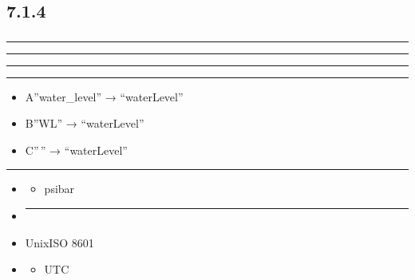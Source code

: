 \subsection{7.1.4}\label{section-24}

\subsubsection{}\label{section-25}

\begin{center}\rule{0.5\linewidth}{0.5pt}\end{center}

\begin{center}\rule{0.5\linewidth}{0.5pt}\end{center}

\begin{center}\rule{0.5\linewidth}{0.5pt}\end{center}

\begin{center}\rule{0.5\linewidth}{0.5pt}\end{center}

\begin{itemize}
\tightlist
\item
  A''water\_level'' → ``waterLevel''
\item
  B''WL'' → ``waterLevel''
\item
  C''\,'' → ``waterLevel''
\end{itemize}

\begin{center}\rule{0.5\linewidth}{0.5pt}\end{center}

\begin{itemize}
\item
  \begin{itemize}
  \tightlist
  \item
    psibar
  \end{itemize}
\item
  \begin{center}\rule{0.5\linewidth}{0.5pt}\end{center}
\item
  UnixISO 8601
\item
  \begin{itemize}
  \tightlist
  \item
    UTC
  \end{itemize}
\end{itemize}

